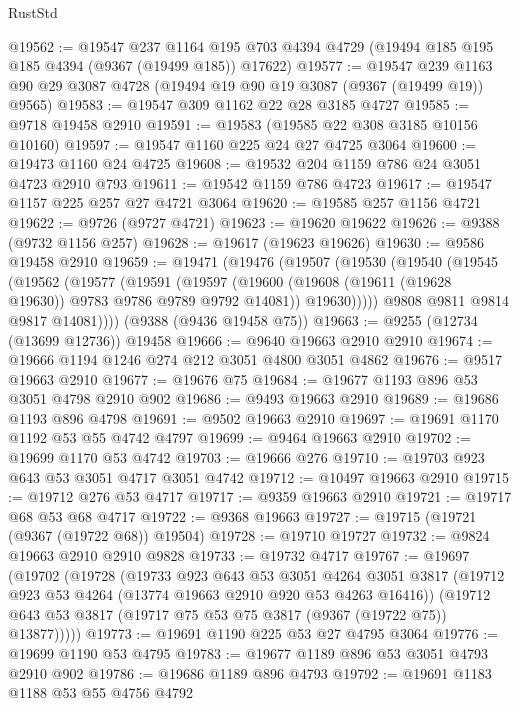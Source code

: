 \begin{lexlean}{RustStd}
\begin{coremodule}
@19562 := @19547
    @237
    @1164
    @195
    @703
    @4394
    @4729
    (@19494 @185 @195 @185 @4394 (@9367 (@19499 @185)) @17622)
@19577 := @19547
    @239
    @1163
    @90
    @29
    @3087
    @4728
    (@19494 @19 @90 @19 @3087 (@9367 (@19499 @19)) @9565)
@19583 := @19547 @309 @1162 @22 @28 @3185 @4727
@19585 := @9718 @19458 @2910
@19591 := @19583 (@19585 @22 @308 @3185 @10156 @10160)
@19597 := @19547 @1160 @225 @24 @27 @4725 @3064
@19600 := @19473 @1160 @24 @4725
@19608 := @19532 @204 @1159 @786 @24 @3051 @4723 @2910 @793
@19611 := @19542 @1159 @786 @4723
@19617 := @19547 @1157 @225 @257 @27 @4721 @3064
@19620 := @19585 @257 @1156 @4721
@19622 := @9726 (@9727 @4721)
@19623 := @19620 @19622
@19626 := @9388 (@9732 @1156 @257)
@19628 := @19617 (@19623 @19626)
@19630 := @9586 @19458 @2910
@19659 := @19471
    (@19476
      (@19507
        (@19530
          (@19540
            (@19545
              (@19562
                (@19577
                  (@19591
                    (@19597
                      (@19600 (@19608 (@19611 (@19628 @19630)) @9783 @9786 @9789 @9792 @14081))
                      @19630)))))
            @9808
            @9811
            @9814
            @9817
            @14081))))
    (@9388 (@9436 @19458 @75))
@19663 := @9255 (@12734 (@13699 @12736)) @19458
@19666 := @9640 @19663 @2910 @2910
@19674 := @19666 @1194 @1246 @274 @212 @3051 @4800 @3051 @4862
@19676 := @9517 @19663 @2910
@19677 := @19676 @75
@19684 := @19677 @1193 @896 @53 @3051 @4798 @2910 @902
@19686 := @9493 @19663 @2910
@19689 := @19686 @1193 @896 @4798
@19691 := @9502 @19663 @2910
@19697 := @19691 @1170 @1192 @53 @55 @4742 @4797
@19699 := @9464 @19663 @2910
@19702 := @19699 @1170 @53 @4742
@19703 := @19666 @276
@19710 := @19703 @923 @643 @53 @3051 @4717 @3051 @4742
@19712 := @10497 @19663 @2910
@19715 := @19712 @276 @53 @4717
@19717 := @9359 @19663 @2910
@19721 := @19717 @68 @53 @68 @4717
@19722 := @9368 @19663
@19727 := @19715 (@19721 (@9367 (@19722 @68)) @19504)
@19728 := @19710 @19727
@19732 := @9824 @19663 @2910 @2910 @9828
@19733 := @19732 @4717
@19767 := @19697
    (@19702
      (@19728
        (@19733
          @923
          @643
          @53
          @3051
          @4264
          @3051
          @3817
          (@19712 @923 @53 @4264 (@13774 @19663 @2910 @920 @53 @4263 @16416))
          (@19712 @643 @53 @3817 (@19717 @75 @53 @75 @3817 (@9367 (@19722 @75)) @13877)))))
@19773 := @19691 @1190 @225 @53 @27 @4795 @3064
@19776 := @19699 @1190 @53 @4795
@19783 := @19677 @1189 @896 @53 @3051 @4793 @2910 @902
@19786 := @19686 @1189 @896 @4793
@19792 := @19691 @1183 @1188 @53 @55 @4756 @4792

\end{coremodule}
\end{lexlean}
